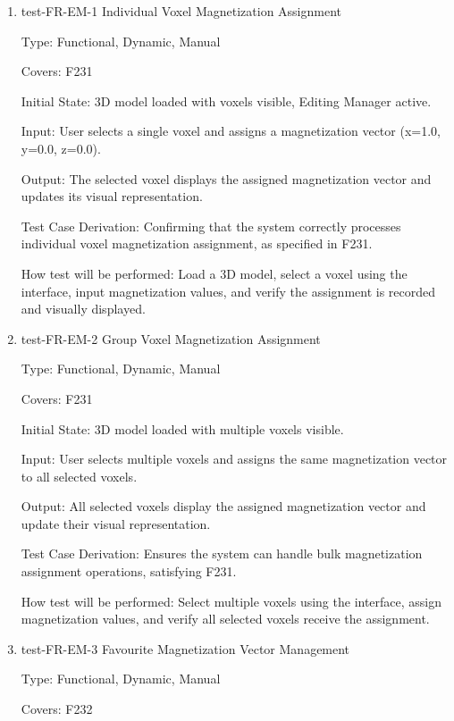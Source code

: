 \documentclass[12pt, titlepage]{article}
\begin{document}
\begin{enumerate}

\item{test-FR-EM-1 Individual Voxel Magnetization Assignment\\}

Type: Functional, Dynamic, Manual

Covers: F231
					
Initial State: 3D model loaded with voxels visible, Editing Manager active.
					
Input: User selects a single voxel and assigns a magnetization vector (x=1.0, y=0.0, z=0.0).
					
Output: The selected voxel displays the assigned magnetization vector and updates its visual representation.

Test Case Derivation: Confirming that the system correctly processes individual voxel magnetization assignment, as specified in F231.
					
How test will be performed: Load a 3D model, select a voxel using the interface, input magnetization values, and verify the assignment is recorded and visually displayed.

\item{test-FR-EM-2 Group Voxel Magnetization Assignment\\}

Type: Functional, Dynamic, Manual

Covers: F231
					
Initial State: 3D model loaded with multiple voxels visible.
					
Input: User selects multiple voxels and assigns the same magnetization vector to all selected voxels.
					
Output: All selected voxels display the assigned magnetization vector and update their visual representation.

Test Case Derivation: Ensures the system can handle bulk magnetization assignment operations, satisfying F231.
					
How test will be performed: Select multiple voxels using the interface, assign magnetization values, and verify all selected voxels receive the assignment.

\item{test-FR-EM-3 Favourite Magnetization Vector Management\\}

Type: Functional, Dynamic, Manual

Covers: F232
					

\end{enumerate}
\end{document}
